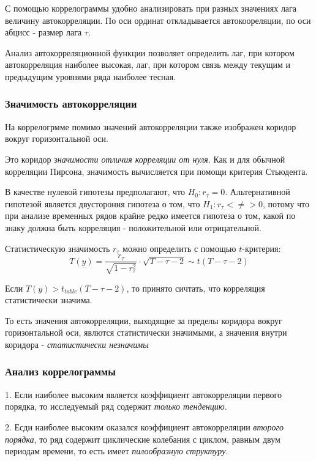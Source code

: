 \documentclass[aps,%
12pt,%
final,%
oneside,
onecolumn,%
musixtex, %
superscriptaddress,%
centertags]{article} %
\theoremstyle{plain}
\theoremstyle{definition}
\theoremstyle{remark}
\begin{document}
С помощью коррелограммы удобно анализировать при разных значениях лага величину автокорреляции. По оси ординат откладывается автокоореляции, по оси абцисс - размер лага $\tau$.

Анализ автокорреляционной функции позволяет определить лаг, при котором автокорреляция наиболее высокая, лаг, при котором связь между текущим и предыдущим уровнями ряда наиболее тесная.

\subsubsection{Значимость автокорреляции}

На коррелогрмме помимо значений автокорреляции также изображен коридор вокруг горизонтальной оси.

Это коридор \textit{значимости отличия корреляции от нуля}. Как и для обычной корреляции Пирсона, значимость вычисляется при помощи критерия Стьюдента.

В качестве нулевой гипотезы предполагают, что $H_0: r_{\tau} = 0$. Альтернативной гипотезой является двустороння гипотеза о том, что $H_1: r_{\tau} < \neq > 0$, потому что при анализе временных рядов крайне редко имеется гипотеза о том, какой по знаку должна быть корреляция - положительной или отрицательной. 

Статистическую значимость $r_{\tau}$ можно определить с помощью $t$-критерия:
$$T(y) = \frac{r_{\tau}}{\sqrt{1-r_{\tau}^2}} \cdot \sqrt{T-\tau-2} \sim t(T-\tau-2)$$

Если $T(y) > t_{table}(T-\tau-2)$, то принято сичтать, что корреляция статистически значима.

То есть значения автокорреляции, выходящие за пределы коридора вокруг горизонтальной оси, явлются статистически значимыми, а значения внутри коридора - \textit{статистически  незначимы}

\subsubsection{Анализ коррелограммы}

1. Если наиболее высоким является коэффициент автокорреляции первого порядка, то исследуемый ряд содержит \textit{только тенденцию}.

2. Есди наиболее высоким оказался коэффициент автокорреляции \textit{второго порядка}, то ряд содержит циклические колебания с циклом, равным двум периодам времени, то есть имеет \textit{пилообразную структуру}.
\end{document}
